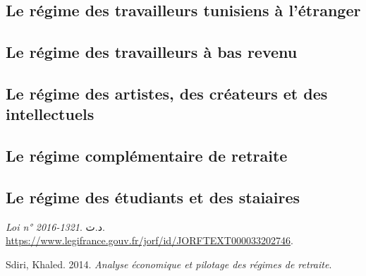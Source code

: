 \documentclass[
  letterpaper,
  DIV=11,
  numbers=noendperiod]{scrreprt}
\newlength{\cslhangindent}
\newenvironment{CSLReferences}[2] %
 {\begin{list}{}{%
  \setlength{\itemindent}{0pt}
  \setlength{\leftmargin}{0pt}
  \setlength{\parsep}{0pt}
  \ifodd #1
   \setlength{\leftmargin}{\cslhangindent}
   \setlength{\itemindent}{-1\cslhangindent}
  \fi
  \setlength{\itemsep}{#2\baselineskip}}}
 {\end{list}}
\begin{document}
\subsection{Le régime des travailleurs tunisiens à
l'étranger}\label{le-ruxe9gime-des-travailleurs-tunisiens-uxe0-luxe9tranger}

\subsection{Le régime des travailleurs à bas
revenu}\label{le-ruxe9gime-des-travailleurs-uxe0-bas-revenu}

\subsection{Le régime des artistes, des créateurs et des
intellectuels}\label{le-ruxe9gime-des-artistes-des-cruxe9ateurs-et-des-intellectuels}

\subsection{Le régime complémentaire de
retraite}\label{le-ruxe9gime-compluxe9mentaire-de-retraite}

\subsection{Le régime des étudiants et des
staiaires}\label{le-ruxe9gime-des-uxe9tudiants-et-des-staiaires}

\label{refs}
\begin{CSLReferences}{1}{0}
\emph{Loi n° 2016-1321}. د.ت.
\url{https://www.legifrance.gouv.fr/jorf/id/JORFTEXT000033202746}.

Sdiri, Khaled. 2014. \emph{Analyse économique et pilotage des régimes de
retraite}.

\end{CSLReferences}
\end{document}
